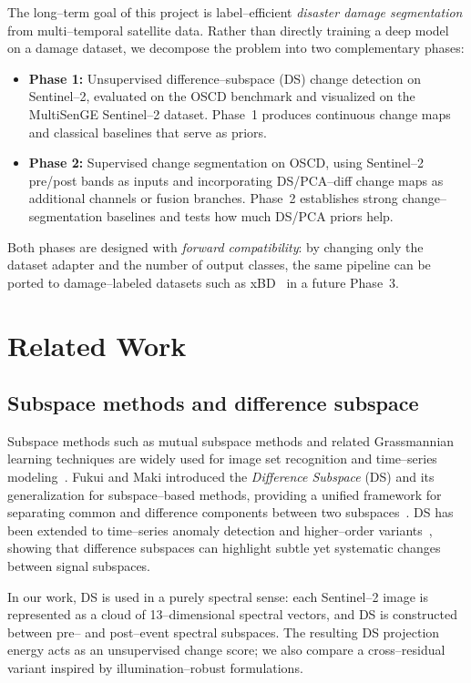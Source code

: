 \documentclass[twoside,11pt]{article}
\begin{document}
The long--term goal of this project is label--efficient \emph{disaster damage
segmentation} from multi--temporal satellite data. Rather than directly
training a deep model on a damage dataset, we decompose the problem into two
complementary phases:

\begin{itemize}
  \item \textbf{Phase 1:} Unsupervised difference--subspace (DS) change
  detection on Sentinel--2, evaluated on the OSCD benchmark and visualized on
  the MultiSenGE Sentinel--2 dataset. Phase~1 produces continuous change maps
  and classical baselines that serve as priors.

  \item \textbf{Phase 2:} Supervised change segmentation on OSCD, using
  Sentinel--2 pre/post bands as inputs and incorporating DS/PCA--diff change
  maps as additional channels or fusion branches. Phase~2 establishes strong
  change--segmentation baselines and tests how much DS/PCA priors help.
\end{itemize}

Both phases are designed with \emph{forward compatibility}: by changing only
the dataset adapter and the number of output classes, the same pipeline can be
ported to damage--labeled datasets such as xBD~\cite{Gupta2019xBD} in a future
Phase~3.

\section{Related Work}

\subsection{Subspace methods and difference subspace}

Subspace methods such as mutual subspace methods and related Grassmannian
learning techniques are widely used for image set recognition and time--series
modeling~\cite{FukuiSubspace}. Fukui and Maki introduced the
\emph{Difference Subspace} (DS) and its generalization for subspace--based
methods, providing a unified framework for separating common and
difference components between two subspaces~\cite{FukuiMaki2015}. DS has been
extended to time--series anomaly detection and higher--order
variants~\cite{FukuiMaki2015,SecondOrderDS}, showing that difference
subspaces can highlight subtle yet systematic changes between signal
subspaces.

In our work, DS is used in a purely spectral sense: each Sentinel--2 image is
represented as a cloud of 13--dimensional spectral vectors, and DS is
constructed between pre-- and post--event spectral subspaces. The resulting
DS projection energy acts as an unsupervised change score; we also compare a
cross--residual variant inspired by illumination--robust formulations.
\end{document}
